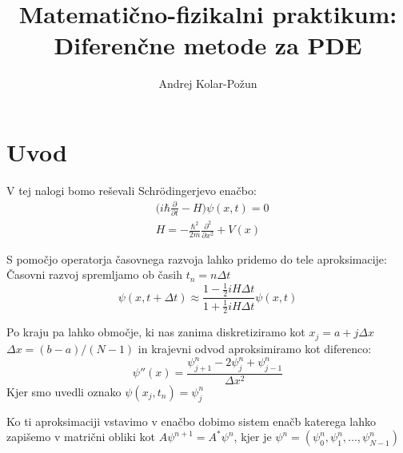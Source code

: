 \documentclass{article}
\title{Matemati{\v c}no-fizikalni praktikum: Diferenčne metode za PDE}
\author{Andrej Kolar-Po{\v z}un}
\begin{document}
\maketitle
\newpage
{}

\section{Uvod}

V tej nalogi bomo reševali Schrödingerjevo enačbo:
\begin{align*}
&\Big(i\hbar \frac{\partial}{\partial t} - H \Big) \psi(x,t) = 0 \\
&H = -\frac{\hbar ^2}{2m} \frac{\partial ^2}{\partial x^2} + V(x) 
\end{align*}

S pomočjo operatorja časovnega razvoja lahko pridemo do tele aproksimacije:
Časovni razvoj spremljamo ob časih $t_n = n \Delta t$
\begin{equation*}
\psi(x,t+\Delta t) \approx \frac{1-\frac{1}{2}i H \Delta t}{1+\frac{1}{2}i H \Delta t}\psi (x,t)
\end{equation*}

Po kraju pa lahko območje, ki nas zanima diskretiziramo kot $x_j = a+j \Delta x$ $\Delta x = (b-a)/(N-1)$ in krajevni odvod
aproksimiramo kot diferenco:
\begin{equation*}
\psi ''(x) = \frac{\psi_{j+1}^n - 2\psi_j^n + \psi_{j-1} ^n}{\Delta x^2}
\end{equation*}
Kjer smo uvedli oznako $\psi(x_j,t_n) = \psi_j^n$

Ko ti aproksimaciji vstavimo v enačbo dobimo sistem enačb katerega lahko zapišemo v matrični
obliki kot $A\psi^{n+1} = A^* \psi^n$, kjer je $\psi ^n = (\psi_0^n,\psi_1^n,...,\psi_{N-1}^n)$
\end{document}
